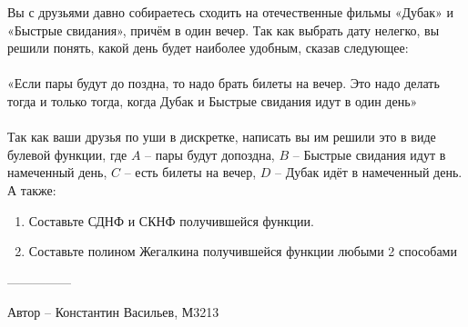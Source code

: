 \question
Вы с друзьями давно собираетесь сходить на отечественные фильмы «Дубак» и «Быстрые свидания», причём в один вечер. Так как выбрать дату нелегко, вы решили понять, какой день будет наиболее удобным, сказав следующее:
\\
\\
«Если пары будут до поздна, то надо брать билеты на вечер. Это надо делать тогда и только тогда, когда Дубак и Быстрые свидания идут в один день»
\\
\\
Так как ваши друзья по уши в дискретке, написать вы им решили это в виде булевой функции, где $A$ – пары будут допоздна, $B$ – Быстрые свидания идут в намеченный день, $C$ – есть билеты на вечер, $D$ – Дубак идёт в намеченный день. А также:
\begin{enumerate}
    \item Составьте СДНФ и СКНФ получившейся функции.
    \item Составьте полином Жегалкина получившейся функции любыми 2 способами
\end{enumerate}

---------------

Автор -- Константин Васильев, М3213